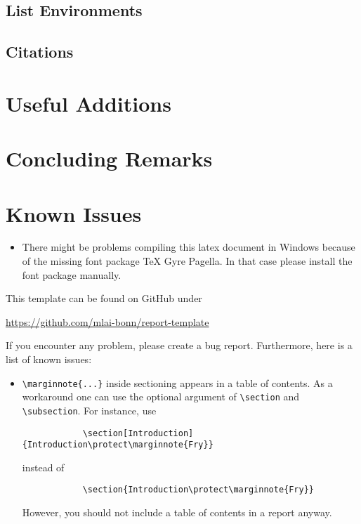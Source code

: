\documentclass[logo]{mlai-report}
\begin{document}
	\subsection{List Environments} 
	
	\subsection{Citations} 
	
	\section{Useful Additions} 
	
	\section{Concluding Remarks}
	
	\printbibliography
	
	\appendix
	
	\section{Known Issues} 
	\begin{itemize}
		\item There might be problems compiling this latex document in Windows because of the missing font package TeX Gyre Pagella. In that case please install the font package manually.
	\end{itemize}
	
	
	This template can be found on GitHub under 
	\begin{center}
		\url{https://github.com/mlai-bonn/report-template}
	\end{center}
	If you encounter any problem, please create a bug report. Furthermore, here is a list of known issues: 
	\begin{itemize} 
		\item \verb|\marginnote{...}| inside sectioning appears in a table of contents. As a work\-around one can use the optional argument of \verb|\section| and \verb|\subsection|. For instance, use 
		\begin{verbatim}
			\section[Introduction]{Introduction\protect\marginnote{Fry}}
		\end{verbatim}
		instead of 
		\begin{verbatim}
			\section{Introduction\protect\marginnote{Fry}}
		\end{verbatim}
		However, you should not include a table of contents in a report anyway. 
	\end{itemize}
\end{document}
